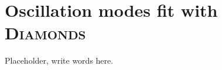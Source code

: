 \appendix
\section{Oscillation modes fit with \textsc{D\large{iamonds}}}
\label{appendix}

Placeholder, write words here.